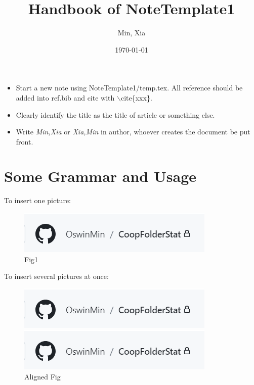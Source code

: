 \documentclass[12pt, a4paper, oneside]{article}
\title{\textbf{Handbook of NoteTemplate1}}
\author{Min, Xia}
\date{\today}
\begin{document}
\maketitle
\setcounter{page}{1}
\begin{itemize}
    \item Start a new note using NoteTemplate1/temp.tex. All reference should be added into ref.bib and cite with $\backslash$cite\{xxx\}.
    \item Clearly identify the title as the title of article or something else.
    \item Write \textit{Min,Xia} or \textit{Xia,Min} in author, whoever creates the document be put front.
\end{itemize}

\section{Some Grammar and Usage}
    To insert one picture:
    \begin{figure}[htbp]
        \centering
        \includegraphics[width=0.6\linewidth]{fig/fig1.png}
        \caption{Fig1}
    \end{figure}


    To insert several pictures at once:
    \begin{figure}[htbp]
        \centering
        \begin{minipage}{0.495\linewidth}
            \centering
            \includegraphics[width=0.98\linewidth]{fig/fig1.png}
        \end{minipage}
        \begin{minipage}{0.495\linewidth}
            \centering
            \includegraphics[width=0.98\linewidth]{fig/fig1.png}
        \end{minipage}
        \caption{Aligned Fig}
    \end{figure}
\end{document}
